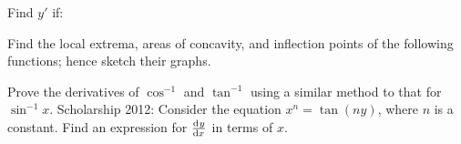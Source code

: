 \begin{questions}
  \questioA Find $ y' $ if:
  \questioE Find the local extrema, areas of concavity, and inflection points of the following functions; hence sketch their graphs.
  \questioS Prove the derivatives of $ \cos^{-1} $ and $ \tan^{-1} $ using a similar method to that for $ \sin^{-1} x $.
  \questioS Scholarship 2012: Consider the equation $ x^n = \tan(ny) $, where $ n $ is a constant. Find an expression
            for $ \od{y}{x} $ in terms of $ x $.
\end{questions}

